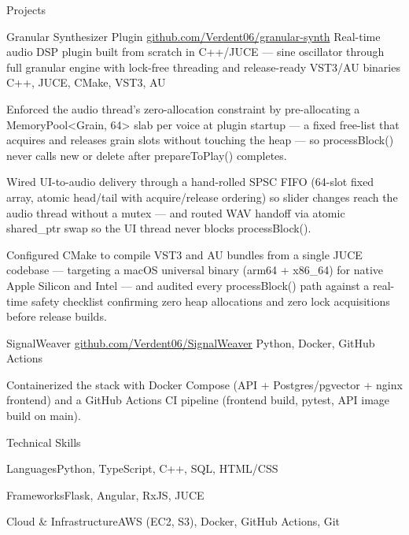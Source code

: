 \documentclass[
	11pt
]{../../../template}
\begin{document}
	\begin{rSection}{P}{rojects}
		\begin{rSectionEntry}
			{Granular Synthesizer Plugin}
			{\href{https://github.com/Verdent06/granular-synth}{github.com/Verdent06/granular-synth}}
			{Real-time audio DSP plugin built from scratch in C++/JUCE --- sine oscillator through full granular engine with lock-free threading and release-ready VST3/AU binaries}
			{C++, JUCE, CMake, VST3, AU}
			{}

			\item Enforced the audio thread's zero-allocation constraint by pre-allocating a MemoryPool<Grain, 64> slab per voice at plugin startup --- a fixed free-list that acquires and releases grain slots without touching the heap --- so processBlock() never calls new or delete after prepareToPlay() completes.
			\item Wired UI-to-audio delivery through a hand-rolled SPSC FIFO (64-slot fixed array, atomic head/tail with acquire/release ordering) so slider changes reach the audio thread without a mutex --- and routed WAV handoff via atomic shared\_ptr swap so the UI thread never blocks processBlock().
			\item Configured CMake to compile VST3 and AU bundles from a single JUCE codebase --- targeting a macOS universal binary (arm64 + x86\_64) for native Apple Silicon and Intel --- and audited every processBlock() path against a real-time safety checklist confirming zero heap allocations and zero lock acquisitions before release builds.
		\end{rSectionEntry}

		\begin{rSectionEntry}
			{SignalWeaver}
			{\href{https://github.com/Verdent06/SignalWeaver}{github.com/Verdent06/SignalWeaver}}
			{}
			{Python, Docker, GitHub Actions}
			{}

			\item Containerized the stack with Docker Compose (API + Postgres/pgvector + nginx frontend) and a GitHub Actions CI pipeline (frontend build, pytest, API image build on main).
		\end{rSectionEntry}
	\end{rSection}

	\begin{rSection}{T}{echnical Skills}
		\begin{rSet}{Languages}{Python, TypeScript, C++, SQL, HTML/CSS}
		\end{rSet}
		\begin{rSet}{Frameworks}{Flask, Angular, RxJS, JUCE}
		\end{rSet}
		\begin{rSet}{Cloud \& Infrastructure}{AWS (EC2, S3), Docker, GitHub Actions, Git}
		\end{rSet}
	\end{rSection}
\end{document}
